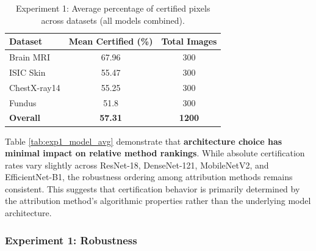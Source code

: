 \documentclass[11pt]{article}
\begin{document}
\begin{table}[h!]
\centering
\caption{Experiment 1: Average percentage of certified pixels across datasets (all models combined).}
\label{tab:exp1_dataset_avg}
\begin{tabular}{lcc}
\toprule
\textbf{Dataset} & \textbf{Mean Certified (\%)} & \textbf{Total Images} \\
\midrule
Brain MRI   & 67.96 & 300 \\
ISIC Skin  & 55.47 & 300 \\
ChestX-ray14 & 55.25 & 300 \\
Fundus     & 51.8 & 300 \\
\midrule
\textbf{Overall} & \textbf{57.31} & \textbf{1200} \\
\bottomrule
\end{tabular}
\end{table}

Table \ref{tab:exp1_model_avg} demonstrate that \textbf{architecture choice has minimal impact on relative method rankings}. While absolute certification rates vary slightly across ResNet-18, DenseNet-121, MobileNetV2, and EfficientNet-B1, the robustness ordering among attribution methods remains consistent. This suggests that certification behavior is primarily determined by the attribution method's algorithmic properties rather than the underlying model architecture.

\begin{table}[h!]
\centering
\caption{Experiment 1: Average percentage of certified pixels per model and dataset.}
\label{tab:exp1_model_avg}
\end{table}




\subsubsection{Experiment 1: Robustness}
\end{document}
